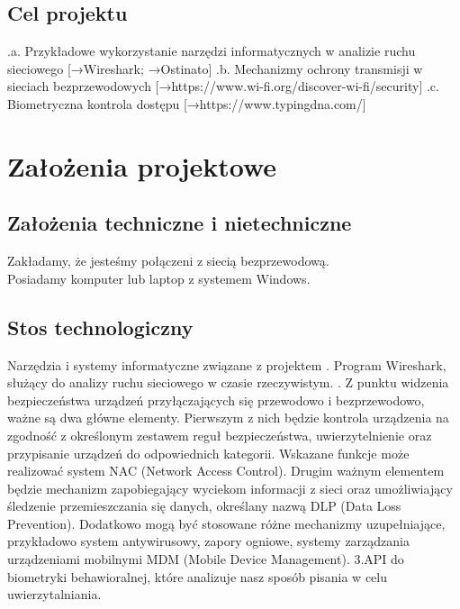 \documentclass[12pt,a4paper]{article}
\begin{document}
\subsection{Cel projektu}
.a. Przykładowe wykorzystanie narzędzi informatycznych w analizie ruchu sieciowego [→Wireshark; →Ostinato]
.b. Mechanizmy ochrony transmisji w sieciach bezprzewodowych [→https://www.wi-fi.org/discover-wi-fi/security]
.c. Biometryczna kontrola dostępu [→https://www.typingdna.com/]

\newpage

\section{Założenia projektowe}

\subsection{Założenia techniczne i nietechniczne}
Zakładamy, że jesteśmy połączeni z siecią bezprzewodową. \\
Posiadamy komputer lub laptop z systemem Windows.

\subsection{Stos technologiczny}
Narzędzia i systemy informatyczne związane z projektem . Program Wireshark, służący do analizy ruchu sieciowego w czasie rzeczywistym. . Z punktu widzenia bezpieczeństwa urządzeń przyłączających się przewodowo i bezprzewodowo, ważne są dwa główne elementy. Pierwszym z nich będzie kontrola urządzenia na zgodność z określonym zestawem reguł bezpieczeństwa, uwierzytelnienie oraz przypisanie urządzeń do odpowiednich kategorii. Wskazane funkcje może realizować system NAC (Network Access Control). Drugim ważnym elementem będzie mechanizm zapobiegający wyciekom informacji z sieci oraz umożliwiający śledzenie przemieszczania się danych, określany nazwą DLP (Data Loss Prevention). Dodatkowo mogą być stosowane różne mechanizmy uzupełniające, przykładowo system antywirusowy, zapory ogniowe, systemy zarządzania urządzeniami mobilnymi MDM (Mobile Device Management).
\newline
3.API do biometryki behawioralnej, które analizuje nasz sposób pisania w celu uwierzytalniania.
\end{document}
